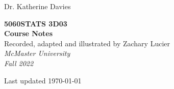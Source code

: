 \documentclass[12pt,notitlepage]{article}
\makeatletter
\theoremstyle{theoremc}
\numberwithin{amstheorem}{section}
\numberwithin{amsdefinition}{section}
\numberwithin{amsexample}{section}
\newcommand\HUGE{\@setfontsize\Huge{50}{60}}
\makeatother
\begin{document}
\AddToShipoutPicture*{\bgpic}

\begin{titlepage} %

    \raggedleft
    
    \vspace*{\baselineskip}
    
    {\Large Dr. Katherine Davies} %
    
    \vspace*{0.167\textheight} %
    
    \textbf{\color{main}\HUGE STATS 3D03}\\[\baselineskip] %
    \textbf{\color{main}\Huge Course Notes}\\[\baselineskip] %

    {\Large Recorded, adapted and illustrated by Zachary Lucier}\\[1.5\baselineskip]
    
    {\Large \textit{McMaster University}}\\[0.5\baselineskip]
    {\Large \textit{Fall 2022}}

    \vspace*{0.167\textheight}

    Last updated \today
    

    

\end{titlepage}

\tableofcontents



\break


\end{document}
